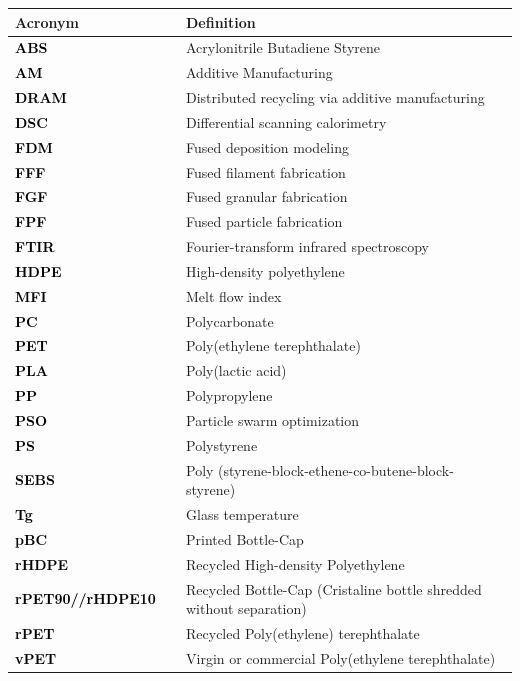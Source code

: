 \documentclass[
  12pt,
]{article}
\begin{document}
\begin{tabular}{>{}ll}
\toprule
Acronym & Definition\\
\midrule
\textcolor{black}{\textbf{ABS }} & Acrylonitrile Butadiene Styrene  \\
\textcolor{black}{\textbf{AM }} & Additive Manufacturing \\
\textcolor{black}{\textbf{DRAM }} & Distributed recycling via additive manufacturing \\
\textcolor{black}{\textbf{DSC }} & Differential scanning calorimetry  \\
\textcolor{black}{\textbf{FDM }} & Fused deposition modeling \\
\textcolor{black}{\textbf{FFF }} & Fused filament fabrication \\
\textcolor{black}{\textbf{FGF }} & Fused granular fabrication \\
\textcolor{black}{\textbf{FPF }} & Fused particle fabrication \\
\textcolor{black}{\textbf{FTIR }} & Fourier-transform infrared spectroscopy  \\
\textcolor{black}{\textbf{HDPE }} & High-density polyethylene \\
\textcolor{black}{\textbf{MFI }} & Melt flow index \\
\textcolor{black}{\textbf{PC }} & Polycarbonate \\
\textcolor{black}{\textbf{PET }} & Poly(ethylene terephthalate) \\
\textcolor{black}{\textbf{PLA }} & Poly(lactic acid) \\
\textcolor{black}{\textbf{PP }} & Polypropylene  \\
\textcolor{black}{\textbf{PSO }} & Particle swarm optimization \\
\textcolor{black}{\textbf{PS }} & Polystyrene \\
\textcolor{black}{\textbf{SEBS }} & Poly (styrene-block-ethene-co-butene-block-styrene) \\
\textcolor{black}{\textbf{Tg }} & Glass temperature \\
\textcolor{black}{\textbf{pBC }} & Printed Bottle-Cap \\
\textcolor{black}{\textbf{rHDPE }} & Recycled High-density Polyethylene \\
\textcolor{black}{\textbf{rPET90//rHDPE10  }} & Recycled Bottle-Cap (Cristaline bottle shredded without separation) \\
\textcolor{black}{\textbf{rPET }} & Recycled Poly(ethylene) terephthalate \\
\textcolor{black}{\textbf{vPET }} & Virgin or commercial Poly(ethylene terephthalate) \\
\bottomrule
\end{tabular}
\endgroup{}
\end{document}
